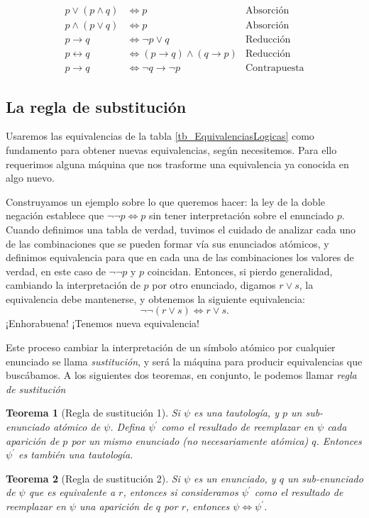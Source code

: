 \documentclass{book}
\newtheorem{thm}{Teorema}[chapter]
\theoremstyle{definition}
\begin{document}
\begin{table}[h]
\begin{align*}
	p \vee (p \wedge q) &\iff p & \text{Absorción} \\
	p \wedge (p \vee q) & \iff p & \text{Absorción}\\
	p \rightarrow q &\iff \neg p \vee q & \text{Reducción}\\
	p \leftrightarrow q &\iff (p \rightarrow q) \wedge (q \rightarrow p) & \text{Reducción}\\
	p \rightarrow q &\iff \neg q \rightarrow \neg p & \text{Contrapuesta}
\end{align*}
\caption{Lista de equivalencias lógicas básicas. Todas ellas pueden ser demostradas haciendo la correspondiente tabla de verdad. A la derecha aparece un nombre para cada una de ellas.}
\label{tb_EquivalenciasLogicas}
\end{table}

\subsection{La regla de substitución}
Usaremos las equivalencias de la tabla \ref{tb_EquivalenciasLogicas} como fundamento para obtener nuevas equivalencias, según necesitemos.
Para ello requerimos alguna máquina que nos trasforme una equivalencia ya conocida en algo nuevo.

Construyamos un ejemplo sobre lo que queremos hacer: la ley de la doble negación establece que $\neg \neg p \iff p$ sin tener interpretación sobre el enunciado $p$.
Cuando definimos una tabla de verdad, tuvimos el cuidado de analizar cada uno de las combinaciones que se pueden formar vía sus enunciados atómicos, y definimos equivalencia para que en cada una de las combinaciones los valores de verdad, en este caso de $\neg \neg p$ y $p$ coincidan.
Entonces, si pierdo generalidad, cambiando la interpretación de $p$ por otro enunciado, digamos $r \vee s$, la equivalencia debe mantenerse, y obtenemos la siguiente equivalencia: \[\neg \neg (r \vee s) \iff r \vee s. \]
¡Enhorabuena! ¡Tenemos nueva equivalencia!

Este proceso cambiar la interpretación de un símbolo atómico por cualquier enunciado se llama \emph{sustitución}, y será la máquina para producir equivalencias que buscábamos.
A los siguientes dos teoremas, en conjunto, le podemos llamar \emph{regla de sustitución}
\begin{thm}[Regla de sustitución 1]
	Si $\psi$ es una tautología, y $p$ un sub-enunciado atómico de $\psi$. Defina $\psi^\prime$ como el resultado de reemplazar en $\psi$ cada aparición de $p$ por un mismo enunciado (no necesariamente atómica) $q$. Entonces $\psi^\prime$ es también una tautología.
\end{thm}
\begin{thm}[Regla de sustitución 2]
	Si $\psi$ es un enunciado, y $q$ un sub-enunciado de $\psi$ que es equivalente a $r$, entonces si consideramos $\psi^\prime$ como el resultado de reemplazar en $\psi$ una aparición de $q$ por $r$, entonces $\psi \iff \psi^\prime$.
\end{thm}
\end{document}
